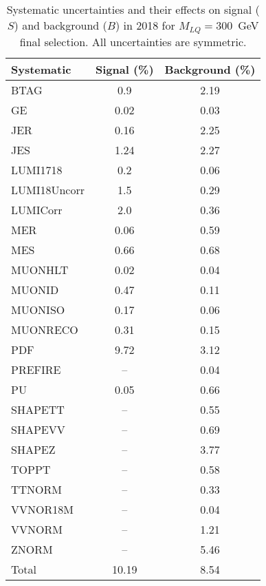 \begin{table}[htbp]
\begin{center}
\caption{Systematic uncertainties and their effects on signal ($S$) and background ($B$) in 2018 for $M_{LQ}=300$~GeV final selection. All uncertainties are symmetric.}
\begin{tabular}{lcc}
\hline\hline
Systematic & Signal (\%) & Background (\%) \\ \hline 
BTAG & 0.9 & 2.19\\ 
GE & 0.02 & 0.03\\ 
JER & 0.16 & 2.25\\ 
JES & 1.24 & 2.27\\ 
LUMI1718 & 0.2 & 0.06\\ 
LUMI18Uncorr & 1.5 & 0.29\\ 
LUMICorr & 2.0 & 0.36\\ 
MER & 0.06 & 0.59\\ 
MES & 0.66 & 0.68\\ 
MUONHLT & 0.02 & 0.04\\ 
MUONID & 0.47 & 0.11\\ 
MUONISO & 0.17 & 0.06\\ 
MUONRECO & 0.31 & 0.15\\ 
PDF & 9.72 & 3.12\\ 
PREFIRE & -- & 0.04\\ 
PU & 0.05 & 0.66\\ 
SHAPETT & -- & 0.55\\ 
SHAPEVV & -- & 0.69\\ 
SHAPEZ & -- & 3.77\\ 
TOPPT & -- & 0.58\\ 
TTNORM & -- & 0.33\\ 
VVNOR18M & -- & 0.04\\ 
VVNORM & -- & 1.21\\ 
ZNORM & -- & 5.46\\ 
Total & 10.19 & 8.54\\ \hline \hline
\end{tabular}
\label{tab:SysUncertainties_uujj_300}
\end{center}
\end{table}

